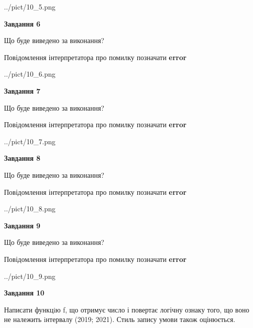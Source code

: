 \documentclass[12pt, ukrainian]{article}
\begin{document}
{\begin {large}
\begin{center}
	{../pict/10_5.png}
\end{center}
\newpage

{\begin {center}\textbf{Завдання 6}\end {center}}\par
Що буде виведено за виконання? \par
Повідомлення інтерпретатора про помилку позначати \textbf{error}

\begin{center}
	{../pict/10_6.png}
\end{center}
\newpage

{\begin {center}\textbf{Завдання 7}\end {center}}\par
Що буде виведено за виконання? \par
Повідомлення інтерпретатора про помилку позначати \textbf{error}

\begin{center}
	{../pict/10_7.png}
\end{center}
\newpage

{\begin {center}\textbf{Завдання 8}\end {center}}\par
Що буде виведено за виконання? \par
Повідомлення інтерпретатора про помилку позначати \textbf{error}

\begin{center}
	{../pict/10_8.png}
\end{center}
\newpage

{\begin {center}\textbf{Завдання 9}\end {center}}\par
Що буде виведено за виконання? \par
Повідомлення інтерпретатора про помилку позначати \textbf{error}

\begin{center}
	{../pict/10_9.png}
\end{center}
\newpage

{\begin {center}\textbf{Завдання 10}\end {center}}\par

Написати функцiю f, що отримує число і повертає логічну ознаку того, що воно не належить iнтервалу (2019; 2021). Стиль запису умови також оцінюється.\par
\newpage

\end {large}}
\end{document}
